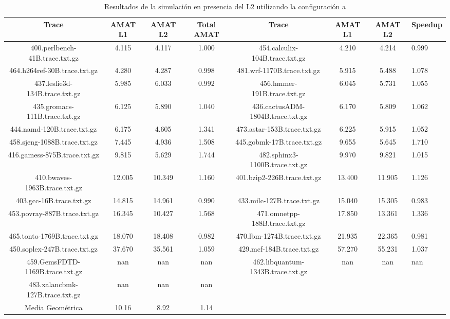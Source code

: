 \begin{table}[H]
\centering
\begin{tabular}{|c|c|c|c|c|c|c|}
\hline
Trace & AMAT L1 & AMAT L2 & Total AMAT & Trace & AMAT L1 & AMAT L2 & Speedup \\
\hline
400.perlbench-41B.trace.txt.gz & 4.115 & 4.117 & 1.000 & 454.calculix-104B.trace.txt.gz & 4.210 & 4.214 & 0.999 \\\hline
464.h264ref-30B.trace.txt.gz & 4.280 & 4.287 & 0.998 & 481.wrf-1170B.trace.txt.gz & 5.915 & 5.488 & 1.078 \\\hline
437.leslie3d-134B.trace.txt.gz & 5.985 & 6.033 & 0.992 & 456.hmmer-191B.trace.txt.gz & 6.045 & 5.731 & 1.055 \\\hline
435.gromacs-111B.trace.txt.gz & 6.125 & 5.890 & 1.040 & 436.cactusADM-1804B.trace.txt.gz & 6.170 & 5.809 & 1.062 \\\hline
444.namd-120B.trace.txt.gz & 6.175 & 4.605 & 1.341 & 473.astar-153B.trace.txt.gz & 6.225 & 5.915 & 1.052 \\\hline
458.sjeng-1088B.trace.txt.gz & 7.445 & 4.936 & 1.508 & 445.gobmk-17B.trace.txt.gz & 9.655 & 5.645 & 1.710 \\\hline
416.gamess-875B.trace.txt.gz & 9.815 & 5.629 & 1.744 & 482.sphinx3-1100B.trace.txt.gz & 9.970 & 9.821 & 1.015 \\\hline
410.bwaves-1963B.trace.txt.gz & 12.005 & 10.349 & 1.160 & 401.bzip2-226B.trace.txt.gz & 13.400 & 11.905 & 1.126 \\\hline
403.gcc-16B.trace.txt.gz & 14.815 & 14.961 & 0.990 & 433.milc-127B.trace.txt.gz & 15.040 & 15.305 & 0.983 \\\hline
453.povray-887B.trace.txt.gz & 16.345 & 10.427 & 1.568 & 471.omnetpp-188B.trace.txt.gz & 17.850 & 13.361 & 1.336 \\\hline
465.tonto-1769B.trace.txt.gz & 18.070 & 18.408 & 0.982 & 470.lbm-1274B.trace.txt.gz & 21.935 & 22.365 & 0.981 \\\hline
450.soplex-247B.trace.txt.gz & 37.670 & 35.561 & 1.059 & 429.mcf-184B.trace.txt.gz & 57.270 & 55.231 & 1.037 \\\hline
459.GemsFDTD-1169B.trace.txt.gz & nan & nan & nan & 462.libquantum-1343B.trace.txt.gz & nan & nan & nan \\\hline
483.xalancbmk-127B.trace.txt.gz & nan & nan & nan &  &  &  &  \\\hline
Media Geométrica & 10.16 & 8.92&1.14 & & & &\\\hline
\end{tabular}
\caption{Resultados de la simulación en presencia del L2 utilizando la configuración a}
\label{tab:amatL1}
\end{table}